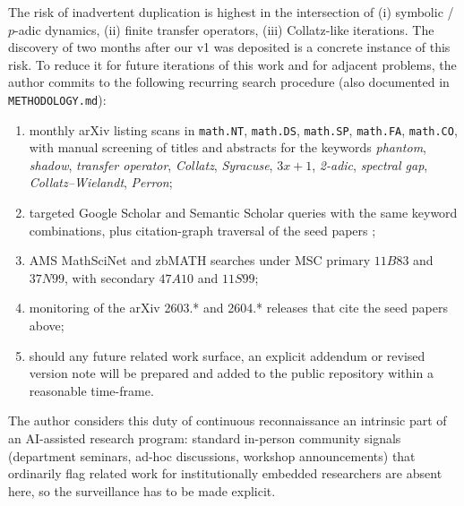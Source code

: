 \documentclass[11pt,a4paper]{article}
\theoremstyle{definition}
\begin{document}
The risk of inadvertent duplication is highest in the
intersection of (i) symbolic / $p$-adic dynamics, (ii) finite
transfer operators, (iii) Collatz-like iterations. The discovery
of \cite{chang2026} two months after our v1 was deposited is a
concrete instance of this risk. To reduce it for future iterations
of this work and for adjacent problems, the author commits to the
following recurring search procedure (also documented in
\texttt{METHODOLOGY.md}):
\begin{enumerate}
  \item monthly arXiv listing scans in \texttt{math.NT},
        \texttt{math.DS}, \texttt{math.SP}, \texttt{math.FA},
        \texttt{math.CO}, with manual screening of titles and
        abstracts for the keywords \emph{phantom}, \emph{shadow},
        \emph{transfer operator}, \emph{Collatz}, \emph{Syracuse},
        \emph{$3x+1$}, \emph{2-adic}, \emph{spectral gap},
        \emph{Collatz--Wielandt}, \emph{Perron};
  \item targeted Google Scholar and Semantic Scholar queries with
        the same keyword combinations, plus citation-graph
        traversal of the seed papers \cite{chang2026,
        siegel2023a, rozier2025, neklyudov2022,
        leventides2020, lemmensnussbaum};
  \item AMS MathSciNet and zbMATH searches under MSC primary
        $11B83$ and $37N99$, with secondary $47A10$ and $11S99$;
  \item monitoring of the arXiv 2603.* and 2604.* releases that
        cite the seed papers above;
  \item should any future related work surface, an explicit
        addendum or revised version note will be prepared and
        added to the public repository within a reasonable
        time-frame.
\end{enumerate}
The author considers this duty of continuous reconnaissance an
intrinsic part of an AI-assisted research program: standard
in-person community signals (department seminars, ad-hoc
discussions, workshop announcements) that ordinarily flag related
work for institutionally embedded researchers are absent here, so
the surveillance has to be made explicit.
\end{document}
